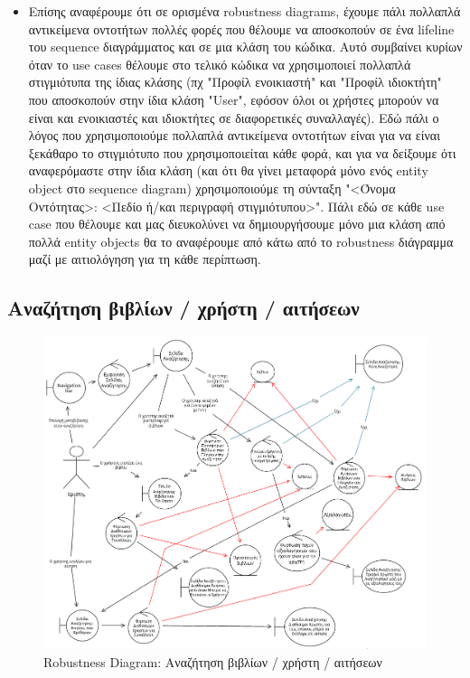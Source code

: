 \documentclass[12pt,a4paper]{article}
\begin{document}
\begin{itemize}
    \item Επίσης αναφέρουμε ότι σε ορισμένα robustness diagrams, έχουμε πάλι πολλαπλά αντικείμενα οντοτήτων πολλές φορές που θέλουμε να αποσκοπούν σε ένα lifeline του sequence διαγράμματος και σε μια κλάση του κώδικα. Αυτό συμβαίνει κυρίων όταν το use cases θέλουμε στο τελικό κώδικα να χρησιμοποιεί πολλαπλά στιγμιότυπα της ίδιας κλάσης (πχ "Προφίλ ενοικιαστή" και "Προφίλ ιδιοκτήτη" που αποσκοπούν στην ίδια κλάση "User", εφόσον όλοι οι χρήστες μπορούν να είναι και ενοικιαστές και ιδιοκτήτες σε διαφορετικές συναλλαγές). Εδώ πάλι ο λόγος που χρησιμοποιούμε πολλαπλά αντικείμενα οντοτήτων είναι για να είναι ξεκάθαρο το στιγμιότυπο που χρησιμοποιείται κάθε φορά, και για να δείξουμε ότι αναφερόμαστε στην ίδια κλάση (και ότι θα γίνει μεταφορά μόνο ενός entity object στο sequence diagram) χρησιμοποιούμε τη σύνταξη "<Όνομα Οντότητας>: <Πεδίο ή/και περιγραφή στιγμιότυπου>". Πάλι εδώ σε κάθε use case που θέλουμε και μας διευκολύνει να δημιουργήσουμε μόνο μια κλάση από πολλά entity objects θα το αναφέρουμε από κάτω από το robustness διάγραμμα μαζί με αιτιολόγηση για τη κάθε περίπτωση.
\end{itemize}

\subsection{Αναζήτηση βιβλίων / χρήστη / αιτήσεων}
\begin{figure}[H]
	\includegraphics[width=\textwidth]{Search Robustness.png}
	\caption{Robustness Diagram: Αναζήτηση βιβλίων / χρήστη / αιτήσεων}
	\label{Robustness Diagram: Αναζήτηση βιβλίων / χρήστη / αιτήσεων}
\end{figure}
\label{Search}
\end{document}
